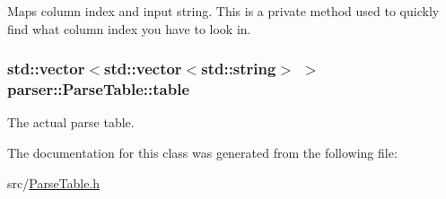 \-Maps column index and input string. \-This is a private method used to quickly find what column index you have to look in. 

\hypertarget{classparser_1_1ParseTable_a3dd2e7557544f4b8f55b2817b82992c4}{
\subsubsection[{table}]{\setlength{\rightskip}{0pt plus 5cm}std\-::vector$<$std\-::vector$<$std\-::string$>$ $>$ {\bf parser\-::\-Parse\-Table\-::table}}}\label{d6/d64/classparser_1_1ParseTable_a3dd2e7557544f4b8f55b2817b82992c4}


\-The actual parse table. 



\-The documentation for this class was generated from the following file\-:\begin{DoxyCompactItemize}
\item 
src/\hyperlink{ParseTable_8h}{\-Parse\-Table.\-h}\end{DoxyCompactItemize}
